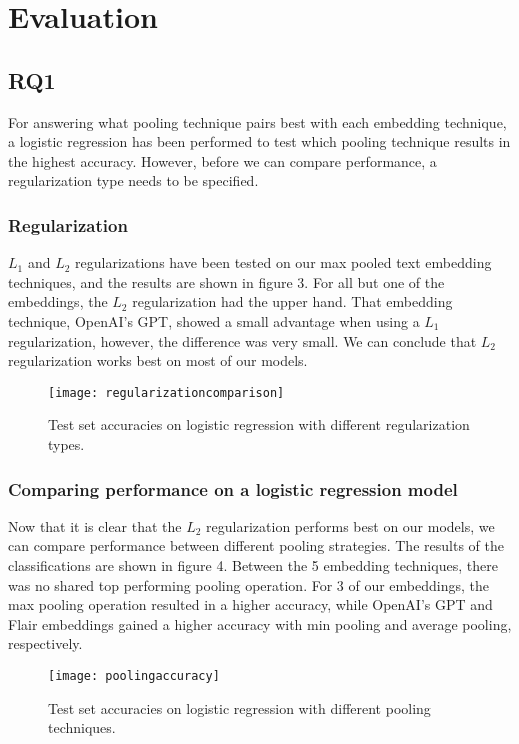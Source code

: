 \section{Evaluation}
\subsection{RQ1}
For answering what pooling technique pairs best with each embedding technique, a logistic regression has been performed to test which pooling technique results in the highest accuracy.
However, before we can compare performance, a regularization type needs to be specified. 

\subsubsection{Regularization}

$L_{1}$ and $L_{2}$ regularizations have been tested on our max pooled text embedding techniques, and the results are shown in figure 3.
For all but one of the embeddings, the $L_{2}$ regularization had the upper hand.
That embedding technique, OpenAI's GPT, showed a small advantage when using a $L_{1}$ regularization, however, the difference was very small.
We can conclude that $L_{2}$ regularization works best on most of our models.

\begin{figure}[h]
    \centering
    \texttt{[image: regularizationcomparison]}
    \caption{Test set accuracies on logistic regression with different regularization types.}
\end{figure}

\subsubsection{Comparing performance on a logistic regression model}
Now that it is clear that the $L_{2}$ regularization performs best on our models, we can compare performance between different pooling strategies.
The results of the classifications are shown in figure 4.
Between the 5 embedding techniques, there was no shared top performing pooling operation. 
For 3 of our embeddings, the max pooling operation resulted in a higher accuracy, while OpenAI's GPT and Flair embeddings gained a higher accuracy with min pooling and average pooling, respectively.

\begin{figure}[t]
    \centering
    \texttt{[image: poolingaccuracy]}
    \caption{Test set accuracies on logistic regression with different pooling techniques.}
\end{figure}

